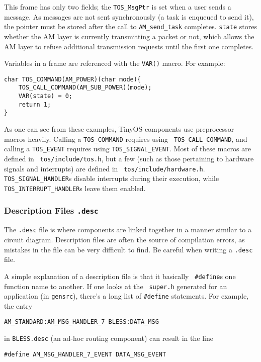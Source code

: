 \documentclass[12pt]{article}
\begin{document}
This frame has only two fields; the {\tt TOS\_MsgPtr} is set when a user
sends a message. As messages are not sent synchronously (a task is
enqueued to send it), the pointer must be stored after the call to
{\tt AM\_send\_task} completes. {\tt state} stores whether the AM layer
is currently transmitting a packet or not, which allows the AM layer
to refuse additional transmission requests until the first one
completes.

Variables in a frame are referenced with the {\tt VAR()} macro. For example:

\begin{verbatim}
char TOS_COMMAND(AM_POWER)(char mode){
    TOS_CALL_COMMAND(AM_SUB_POWER)(mode);
    VAR(state) = 0;
    return 1;
}
\end{verbatim}

As one can see from these examples, TinyOS components use preprocessor
macros heavily. Calling a {\tt TOS\_COMMAND} requires using {\tt
TOS\_CALL\_COMMAND}, and calling a {\tt TOS\_EVENT} requires using
{\tt TOS\_SIGNAL\_EVENT}. Most of these macros are defined in {\tt
tos/include/tos.h}, but a few (such as those pertaining to hardware
signals and interrupts) are defined in {\tt
tos/include/hardware.h}. {\tt TOS\_SIGNAL\_HANDLER}s disable
interrupts during their execution, while {\tt
TOS\_INTERRUPT\_HANDLER}s leave them enabled.

\subsubsection*{Description Files {\tt .desc}}

The {\tt .desc} file is where components are linked together in a
manner similar to a circuit diagram. Description files are often the
source of compilation errors, as mistakes in the file can be very
difficult to find. Be careful when writing a {\tt .desc} file.

A simple explanation of a description file is that it basically {\tt
\#define}s one function name to another. If one looks at the {\tt
super.h} generated for an application (in {\tt gensrc}), there's a
long list of {\tt \#define} statements. For example, the entry

\begin{verbatim}
AM_STANDARD:AM_MSG_HANDLER_7 BLESS:DATA_MSG
\end{verbatim}

in {\tt BLESS.desc} (an ad-hoc routing component) can result in the line

\begin{verbatim}
#define AM_MSG_HANDLER_7_EVENT DATA_MSG_EVENT
\end{verbatim}
\end{document}
